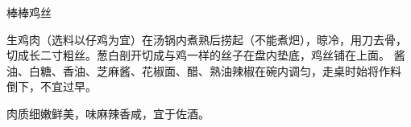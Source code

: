 \begin{recipe}{棒棒鸡丝}

\ingredients


\preparation

\step 生鸡肉（选料以仔鸡为宜）在汤锅内煮熟后捞起（不能煮𤆵），晾冷，用刀去骨，
切成长二寸粗丝。葱白剖开切成与鸡一样的丝子在盘内垫底，鸡丝铺在上面。
\step 酱油、白糖、香油、芝麻酱、花椒面、醋、熟油辣椒在碗内调匀，走桌时始将作料
倒下，不宜过早。

\features

肉质细嫩鲜美，味麻辣香咸，宜于佐酒。

\end{recipe}

